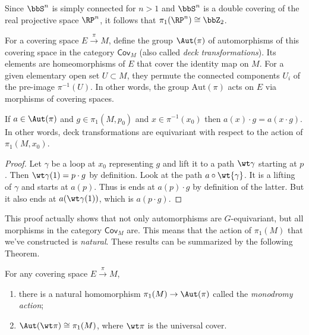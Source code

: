 \begin{example}
    Since $\bbS^n$ is simply connected for $n>1$ and $\bbS^n$ is a double covering of the real projective space $\RP^n$, it follows that $\pi_1(\RP^n)\cong \bbZ_2$.
\end{example}

\begin{defn}
    For a covering space $E\overset{\pi}{\to}{M}$, define the group $\Aut(\pi)$ of automorphisms of this covering space in the category $\mathsf{Cov}_M$ (also called \emph{deck transformations}). Its elements are homeomorphisms of $E$ that cover the identity map on $M$. For a given elementary open set $U\subset M$, they permute the connected components $U_i$ of the pre-image $\pi^{-1}(U)$. In other words, the group $\mathrm{Aut}(\pi)$ acts on $E$ via morphisms of covering spaces.
\end{defn}

\begin{prop}\label{prop 6.2 Bredon}
    If $a\in \Aut(\pi)$ and $g\in\pi_1(M,p_0)$ and $x\in \pi^{-1}(x_0)$ then $a(x)\cdot g=a(x\cdot g)$. In other words, deck transformations are equivariant with respect to the action of $\pi_1(M,x_0)$.
\end{prop}
\begin{proof}
    Let $\gamma$ be a loop at $x_0$ representing $g$ and lift it to a path $\wt\gamma$ starting at $p$. Then $\wt\gamma(1)=p\cdot g$ by definition. Look at the path $a\circ \wt{\gamma}$. It is a lifting of $\gamma$ and starts at $a(p)$. Thus is ends at $a(p)\cdot g$ by definition of the latter. But it also ends at $a(\wt\gamma(1))$, which is $a(p\cdot g)$.
\end{proof}

This proof actually shows that not only automorphisms are $G$-equivariant, but all morphisms in the category $\mathsf{Cov}_M$ are. This means that the action of $\pi_1(M)$ that we've constructed is \emph{natural}. These results can be summarized by the following Theorem.
\begin{thm}
For any covering space $E\overset{\pi}\to M$, 
\begin{enumerate}
    \item there is a natural homomorphism $\pi_1(M)\to \Aut(\pi)$ called the \emph{monodromy action};
    \item $\Aut(\wt \pi)\cong\pi_1(M)$, where $\wt\pi$ is the universal cover.
\end{enumerate}
\end{thm}

